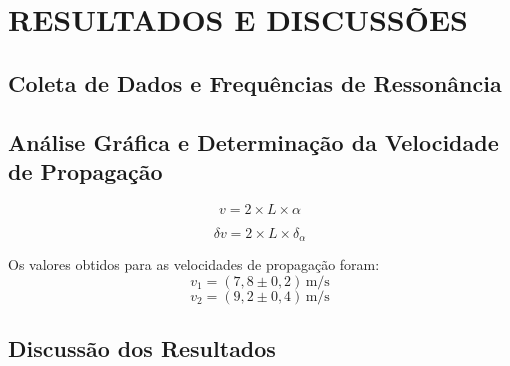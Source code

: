 \section{RESULTADOS E DISCUSSÕES}

\subsection{Coleta de Dados e Frequências de Ressonância}




\subsection{Análise Gráfica e Determinação da Velocidade de Propagação}




\begin{equation}
v = 2 \times L \times \alpha
\label{eq:velocidadecalc}
\end{equation}

\begin{equation}
\delta v = 2 \times L \times \delta_\alpha
\label{eq:errovelocidade}
\end{equation}

Os valores obtidos para as velocidades de propagação foram:
\[
\boxed{
v_1 = (7,8 \pm 0,2)\, \text{m/s}
}
\]
\[
\boxed{
v_2 = (9,2 \pm 0,4)\, \text{m/s}
}
\]

\subsection{Discussão dos Resultados}